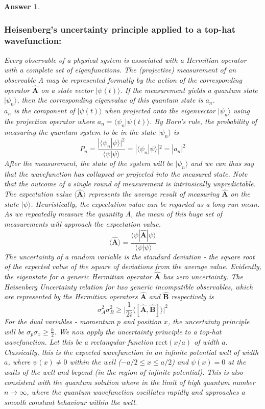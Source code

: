 \documentclass[a4paper]{article}
\newtheorem{ans}{Answer}[subsection]
\theoremstyle{new}
\begin{document}
\begin{ans}\leavevmode
\subsubsection*{Heisenberg's uncertainty principle applied to a top-hat wavefunction:}
Every observable of a physical system is associated with a Hermitian operator with a complete set of eigenfunctions. The (projective) measurement of an observable A may be represented formally by the action of the corresponding operator $\mathbf{\hat{A}}$ on a state vector $|\psi(t)\big\rangle$. If the measurement yields a quantum state $|\psi_n\big\rangle$, then the corresponding eigenvalue of this quantum state is $a_n$.\\[5pt]
$a_n$ is the component of $|\psi(t)\big\rangle$ when projected onto the eigenvector $|\psi_n\big\rangle$ using the projection operator where $a_n=\big\langle\psi_n|\psi(t)\big\rangle$. By Born's rule, the probability of measuring the quantum system to be in the state $|\psi_n\big\rangle$ is 
$$P_n=\frac{|\big\langle\psi_n|\psi\big\rangle|^2}{\big\langle\psi|\psi\big\rangle}=|\big\langle\psi_n|\psi\big\rangle|^2=|a_n|^2$$
After the measurement, the state of the system will be $|\psi_n\big\rangle$  and we can thus say that the wavefunction has collapsed or projected into the measured state. Note that the outcome of a single round of measurement is intrinsically unpredictable.\\[5pt]
The expectation value $\big\langle\mathbf{\hat{A}}\big\rangle$ represents the average result of measuring $\mathbf{\hat{A}}$ on the state $|\psi\big\rangle$. Heuristically, the expectation value can be regarded as a long-run mean. As we repeatedly measure the quantity A, the mean of this huge set of measurements will approach the expectation value. 
$$\langle\mathbf{\hat{A}}\rangle=\frac{\langle\psi|\mathbf{\hat{A}}|\psi\rangle}{\langle\psi|\psi\rangle}$$
The uncertainty of a random variable is the standard deviation - the square root of the expected value of the square of deviations from the average value. Evidently, the eigenstate for a generic Hermitian operator $\mathbf{\hat{A}}$ has zero uncertainty. The Heisenberg Uncertainty relation for two generic incompatible observables, which are represented by the  Hermitian operators $\mathbf{\hat{A}}$ and $\mathbf{\hat{B}}$ respectively is
$$\sigma_A^2\sigma_B^2\geq\bigg|\frac{1}{2i}\big\langle[\mathbf{\hat{A}},\mathbf{\hat{B}}]\big\rangle\bigg|^2$$
For the dual variables - momentum $p$ and position $x$, the uncertainty principle will be $\sigma_p\sigma_x\geq\frac{\hbar}{2}$. We now apply the uncertainty principle to a top-hat wavefunction. Let this be a rectangular function $\text{rect}(x/a)$ of width $a$. Classically, this is the expected wavefunction in an infinite potential well of width $a$, where $\psi(x)\neq 0$ within the well ($-a/2\leq x\leq a/2$) and $\psi(x)=0$ at the walls of the well and beyond (in the region of infinite potential). This is also consistent with the quantum solution where in the limit of high quantum number $n\rightarrow\infty$, where the quantum wavefunction oscillates rapidly and approaches a smooth constant behaviour within the well.\\[5pt]

\end{ans}
\end{document}
